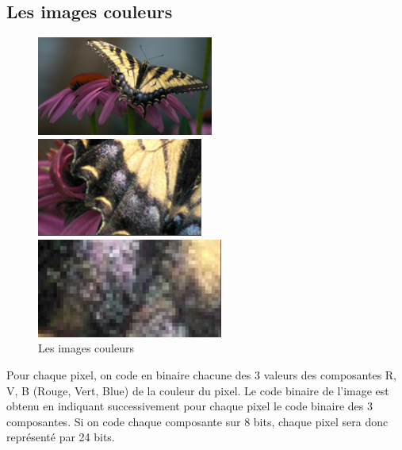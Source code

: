 \documentclass[12pt,a4paper]{report}
\numberwithin{equation}{subsection}
\numberwithin{equation}{section}
\begin{document}
\subsection{Les images couleurs}
\begin{figure}[!h]
    \centering
    \begin{minipage}[b]{0.3\textwidth}
        \includegraphics[height=3.25cm,width=3.5cm\textwidth]{couleur1.jpg}
    \end{minipage}
    \begin{minipage}[b]{0.3\textwidth}
        \includegraphics[height=3.25cm,width=3.5cm\textwidth]{couleur2.png}
    \end{minipage}
    \begin{minipage}[b]{0.3\textwidth}
        \includegraphics[height=3.25cm,width=3.5cm\textwidth]{couleur3.png}
    \end{minipage}
    \caption{Les images couleurs}
\end{figure}
Pour chaque pixel, on code en binaire chacune des 3 valeurs des composantes R, V, B (Rouge, Vert, Blue) de la couleur du pixel. Le code binaire de l'image est obtenu en indiquant successivement pour chaque pixel le code binaire des 3 composantes. Si on code chaque composante sur 8 bits, chaque pixel sera donc représenté par 24 bits.

\newpage
\newline
\newline
\newline
\end{document}
